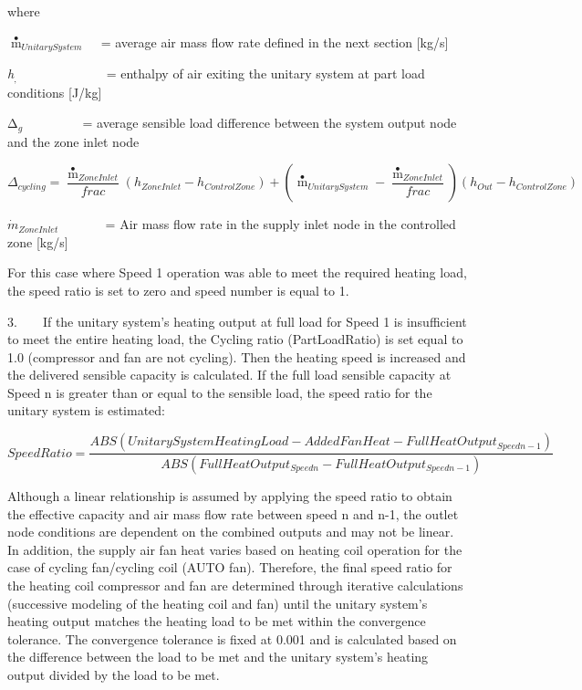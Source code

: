 where

\({{\mathop m\limits^ \bullet }_{UnitarySystem}}\) ~ = average air mass flow rate defined in the next section {[}kg/s{]}

\emph{h\(_{,}\)} ~~~~~~~~~~~ ~ = enthalpy of air exiting the unitary system at part load conditions {[}J/kg{]}

Δ\emph{\(_{g}\)} ~~~~~~~~ = average sensible load difference between the system output node and the zone inlet node

\begin{equation}
{\Delta_{cycling}} = \frac{{{{\mathop m\limits^ \bullet  }_{ZoneInlet}}}}{{frac}}\left( {{h_{ZoneInlet}} - {h_{ControlZone}}} \right) + \left( {{{\mathop m\limits^ \bullet  }_{UnitarySystem}} - \frac{{{{\mathop m\limits^ \bullet  }_{ZoneInlet}}}}{{frac}}} \right)\left( {{h_{Out}} - {h_{ControlZone}}} \right)
\end{equation}

\({\dot m_{ZoneInlet}}\) ~~~~~~ = Air mass flow rate in the supply inlet node in the controlled zone {[}kg/s{]}

For this case where Speed 1 operation was able to meet the required heating load, the speed ratio is set to zero and speed number is equal to 1.

3.~~~~If the unitary system's heating output at full load for Speed 1 is insufficient to meet the entire heating load, the Cycling ratio (PartLoadRatio) is set equal to 1.0 (compressor and fan are not cycling). Then the heating speed is increased and the delivered sensible capacity is calculated. If the full load sensible capacity at Speed n is greater than or equal to the sensible load, the speed ratio for the unitary system is estimated:

\begin{equation}
SpeedRatio = \frac{{ABS\left( {UnitarySystemHeatingLoad - AddedFanHeat - FullHeatOutpu{t_{Speedn - 1}}} \right)}}{{ABS\left( {FullHeatOutpu{t_{Speedn}} - FullHeatOutpu{t_{Speedn - 1}}} \right)}}
\end{equation}

Although a linear relationship is assumed by applying the speed ratio to obtain the effective capacity and air mass flow rate between speed n and n-1, the outlet node conditions are dependent on the combined outputs and may not be linear. In addition, the supply air fan heat varies based on heating coil operation for the case of cycling fan/cycling coil (AUTO fan). Therefore, the final speed ratio for the heating coil compressor and fan are determined through iterative calculations (successive modeling of the heating coil and fan) until the unitary system's heating output matches the heating load to be met within the convergence tolerance. The convergence tolerance is fixed at 0.001 and is calculated based on the difference between the load to be met and the unitary system's heating output divided by the load to be met.

